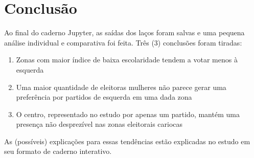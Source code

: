\documentclass{article}
\begin{document}
	\newpage

	\section{Conclusão} 

	Ao final do caderno Jupyter, as saídas dos laços foram salvas e uma pequena análise individual e comparativa
	foi feita. Três (3) conclusões foram tiradas: 

	\begin{enumerate} 
		\item{Zonas com maior índice de baixa escolaridade tendem a votar menos à esquerda}
		\item{Uma maior quantidade de eleitoras mulheres não parece gerar uma preferência 
			por partidos de esquerda em uma dada zona}
		\item{O centro, representado no estudo por apenas um partido, mantém uma presença não 
			desprezível nas zonas eleitorais cariocas}

	\end{enumerate} 

	As (possíveis) explicações para essas tendências estão explicadas no estudo em seu formato de caderno 
	interativo.
\end{document}
